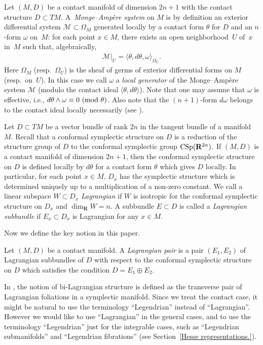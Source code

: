 \documentclass[11pt]{article}
\begin{document}
Let $(M, D)$ be a contact manifold of dimension $2n+1$ with
the contact structure \mbox{$D \subset TM$}.
A~{\it Monge--Amp{\`e}re system}
on $M$ is by def\/inition an exterior dif\/ferential system ${\mathcal M} \subset \Omega_M$
ge\-ne\-rated locally by a contact form $\theta$ for $D$ and an
$n$-form $\omega$ on~$M$: for each point $x \in M$,
there exists an open neighborhood~$U$ of~$x$ in~$M$ such that,
algebraically,
\begin{gather*}
{\mathcal M}\vert_U =
\langle \theta, d\theta, \omega
\rangle_{\Omega_U}.
\end{gather*}
Here $\Omega_M$ (resp.\ $\Omega_U$)
is the sheaf of germs of
exterior dif\/ferential forms
on $M$ (resp.\ on~$U$). In this case we call
$\omega$ a {\it local generator} of the Monge--Amp{\`e}re system
${\mathcal M}$ (modulo the contact ideal $\langle \theta, d\theta \rangle$).
Note that one may assume that $\omega$ is ef\/fective, i.e.,
$d\theta \wedge \omega \equiv
0\ (\rm{mod}\ \theta)$.
Also note that the $(n+1)$-form
$d\omega$ belongs to the contact ideal locally necessarily (see \cite{B1,B2, L}).

Let $D \subset TM$ be a vector bundle of rank $2n$ in the tangent bundle of a manifold $M$.
Recall that a conformal symplectic structure on $D$ is a reduction of the structure group of $D$
to the conformal symplectic group ${\rm CSp}({\mathbf{R}}^{2n})$.
If $(M, D)$ is a contact manifold of dimension $2n+1$, then
the conformal symplectic structure on $D$ is def\/ined locally by $d\theta$ for a contact form
$\theta$ which gives $D$ locally.
In particular, for each point $x \in M$, $D_x$ has the symplectic structure which is determined uniquely up to
a multiplication of a non-zero constant.
We call a linear subspace $W \subset D_x$
{\it Lagrangian} if $W$ is isotropic for the conformal symplectic structure on $D_x$ and $\dim_{{\mathbf{R}}} W = n$.
A subbundle $E \subset D$ is called a {\it Lagrangian subbundle} if $E_x \subset D_x$ is Lagrangian for any $x \in M$.

Now we def\/ine the key notion in this paper.

\begin{Def}
Let $(M, D)$ be a contact manifold.
A {\it Lagrangian pair} is a pair $(E_1, E_2)$
of Lagrangian subbundles of $D$ with respect to the conformal symplectic structure
on $D$ which satisf\/ies the condition $D = E_1 \oplus E_2$.
\end{Def}

\begin{Rem}
In \cite[\S~5.2]{B}, the notion of bi-Lagrangian structure is def\/ined as the transverse pair of Lagrangian foliations in a symplectic manifold.
Since we treat the contact case, it might be natural to use
the terminology  ``Legendrian'' instead of ``Lagrangian''.
However we would like to use ``Lagrangian'' in the general cases, and
to use the terminology ``Legendrian'' just for the integrable cases, such as ``Legendrian submanifolds'' and
``Legendrian f\/ibrations'' (see Section~\ref{Hesse representations.}).
\end{Rem}
\end{document}
